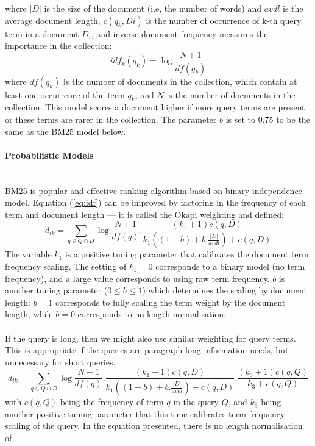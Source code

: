 where $ |D| $ is the size of the document (i.e, the number of words) and $ avdl $ is the average document length, $ c(q_{k},Di)$ is the number of occurrence of k-th query term in a document $ D_{i} $, and inverse document frequency measures the importance in the collection: 
\begin{equation}
idf_{k}(q_{k})=\log\frac{N+1}{df(q_{k})}
\label{eq:idf}
\end{equation}
where $ df(q_{k}) $ is the number of documents in the collection, which contain at least one occurrence of the term $ q_{k} $, and $ N $ is the number of documents in the collection. 
This model scores a document higher if more query terms are present or these terms are rarer in the collection. The parameter $ b $ is set to 0.75 to be the same as the BM25 model below.
\paragraph{Probabilistic Models}
\ \\
BM25 is popular and effective ranking algorithm based on binary independence model. Equation (\ref{eq:idf}) can be improved by factoring in the frequency of each term and document length --- it is called the Okapi weighting and defined:
\begin{equation}
d_{ik}=\sum\limits_{q \in Q\cap D}\log\frac{N+1}{df(q)}.\frac{(k_{1}+1)c(q,D)}{k_{1}((1-b)+b.\frac{|D|}{avdl})+c(q,D)}
\label{eq:idfbm25}
\end{equation}
The variable $ k_{1} $ is a positive tuning parameter that calibrates the document term frequency scaling. The setting of $ k_{1}=0 $ corresponds to a binary model (no term frequency), and a large value corresponds to using raw term
frequency. $ b $ is another tuning parameter ($ 0 \leq b \leq 1 $) which determines the scaling by document length: $ b = 1 $ corresponds to fully scaling the term weight by the document length, while $ b = 0 $ corresponds to no length normalisation. \\\\
If the query is long, then we might also use similar weighting for query terms. This is appropriate if the queries are paragraph long information needs, but unnecessary for short queries.
\begin{equation}
d_{ik}=\sum\limits_{q \in Q\cap D}\log\frac{N+1}{df(q)}.\frac{(k_{1}+1)c(q,D)}{k_{1}((1-b)+b.\frac{|D|}{avdl})+c(q,D)}.\frac{(k_{3}+1)c(q,Q)}{k_{3}+c(q,Q)}
\label{eq:idfbm25}
\end{equation}
with $ c(q,Q) $ being the frequency of term $ q $ in the query $ Q $, and $ k_{3} $ being another positive tuning parameter that this time calibrates term frequency scaling of the query. In the equation presented, there is no length normalisation of
